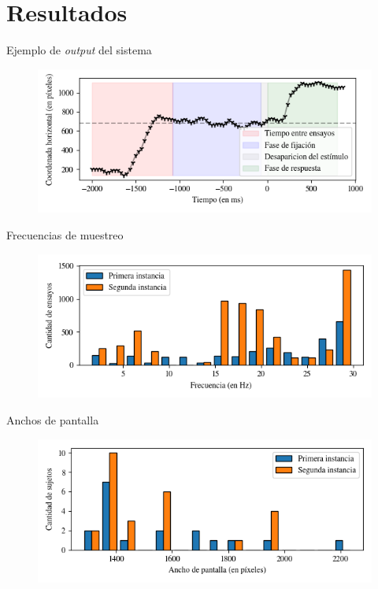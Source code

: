 \documentclass[aspectratio=169]{beamer}
\begin{document}
\section{Resultados}

\begin{frame}{Ejemplo de \textit{output} del sistema}
  \begin{figure}
    \centering
    \includegraphics[width=\linewidth]{plots/output-example.png}
  \end{figure}
\end{frame}

\begin{frame}{Frecuencias de muestreo}
  \begin{figure}
    \centering
    \includegraphics[width=\linewidth]{plots/sampling-frequencies-distribution.png}
  \end{figure}
\end{frame}

\begin{frame}{Anchos de pantalla}
  \begin{figure}
    \centering
    \includegraphics[width=\linewidth]{plots/screens-widths-distribution.png}
  \end{figure}
\end{frame}
\end{document}
